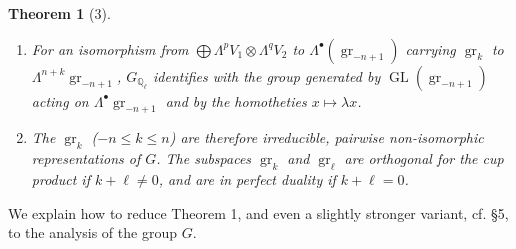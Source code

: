 \documentclass[11pt]{article}
\newcommand{\Q}{\mathbb Q}
\newcommand{\GL}{\operatorname{GL}}
\newcommand{\gr}{\operatorname{gr}}
\theoremstyle{deligne}
\newtheorem*{theorem*}{Theorem}
\newcommand{\heading}[1]{\vspace{0.7em}\noindent{\bfseries #1}\quad}
\begin{document}
\begin{theorem*}[3]
\begin{enumerate}[label=(\roman*)]
\item For an isomorphism from $\bigoplus\Lambda^pV_1\otimes\Lambda^qV_2$ to $\Lambda^\bullet(\gr_{-n+1})$ carrying $\gr_k$ to $\Lambda^{n+k}\gr_{-n+1}$, $G_{\Q_\ell}$ identifies with the group generated by $\GL(\gr_{-n+1})$ acting on $\Lambda^\bullet\gr_{-n+1}$ and by the homotheties $x\mapsto\lambda x$.
\item The $\gr_k$ ($-n\le k\le n$) are therefore irreducible, pairwise non-isomorphic representations of $G$. The subspaces $\gr_k$ and $\gr_\ell$ are orthogonal for the cup product if $k+\ell\ne0$, and are in perfect duality if $k+\ell=0$.
\end{enumerate}
\end{theorem*}

\heading{2.}
We explain how to reduce Theorem 1, and even a slightly stronger variant, cf. \S5, to the analysis of the group $G$.
\end{document}
